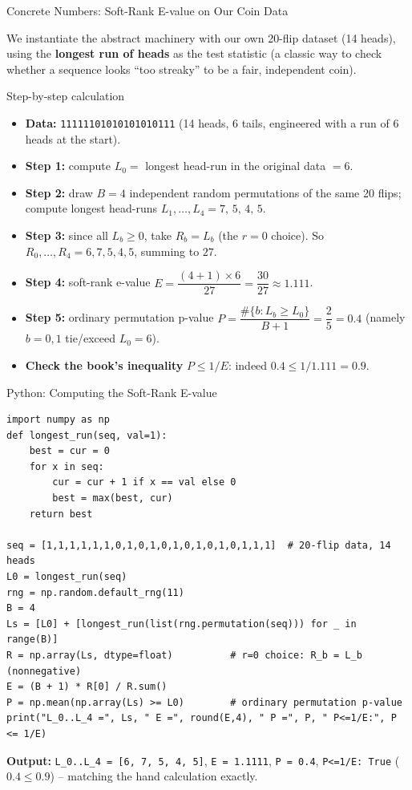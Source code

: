 \documentclass[aspectratio=169,10pt]{beamer}
\begin{document}
\begin{frame}{Concrete Numbers: Soft-Rank E-value on Our Coin Data}

\small
We instantiate the abstract machinery with our own 20-flip dataset (14
heads), using the \textbf{longest run of heads} as the test statistic
(a classic way to check whether a sequence looks ``too streaky'' to be a
fair, independent coin).

\begin{block}{Step-by-step calculation}
\begin{itemize}
  \item \textbf{Data:} \texttt{11111101010101010111} (14 heads, 6 tails,
    engineered with a run of 6 heads at the start).
  \item \textbf{Step 1:} compute $L_0 = $ longest head-run in the original
    data $= 6$.
  \item \textbf{Step 2:} draw $B=4$ independent random permutations of the
    same 20 flips; compute longest head-runs
    $L_1,\dots,L_4 = 7,\,5,\,4,\,5$.
  \item \textbf{Step 3:} since all $L_b\ge 0$, take $R_b=L_b$ (the $r=0$
    choice). So $R_0,\dots,R_4 = 6,7,5,4,5$, summing to $27$.
  \item \textbf{Step 4:} soft-rank e-value
    $E = \dfrac{(4+1)\times 6}{27} = \dfrac{30}{27} \approx 1.111$.
  \item \textbf{Step 5:} ordinary permutation p-value
    $P = \dfrac{\#\{b: L_b\ge L_0\}}{B+1} = \dfrac{2}{5} = 0.4$
    (namely $b=0,1$ tie/exceed $L_0=6$).
  \item \textbf{Check the book's inequality} $P\le 1/E$:
    indeed $0.4 \le 1/1.111 = 0.9$. \checkmark
\end{itemize}
\end{block}

\end{frame}

\begin{frame}[fragile]{Python: Computing the Soft-Rank E-value}

\begin{lstlisting}
import numpy as np
def longest_run(seq, val=1):
    best = cur = 0
    for x in seq:
        cur = cur + 1 if x == val else 0
        best = max(best, cur)
    return best

seq = [1,1,1,1,1,1,0,1,0,1,0,1,0,1,0,1,0,1,1,1]  # 20-flip data, 14 heads
L0 = longest_run(seq)
rng = np.random.default_rng(11)
B = 4
Ls = [L0] + [longest_run(list(rng.permutation(seq))) for _ in range(B)]
R = np.array(Ls, dtype=float)          # r=0 choice: R_b = L_b (nonnegative)
E = (B + 1) * R[0] / R.sum()
P = np.mean(np.array(Ls) >= L0)        # ordinary permutation p-value
print("L_0..L_4 =", Ls, " E =", round(E,4), " P =", P, " P<=1/E:", P <= 1/E)
\end{lstlisting}

\medskip
\textbf{Output:} \texttt{L\_0..L\_4 = [6, 7, 5, 4, 5]},
\texttt{E = 1.1111}, \texttt{P = 0.4}, \texttt{P<=1/E: True}
($0.4 \le 0.9$) -- matching the hand calculation exactly.

\end{frame}
\end{document}
